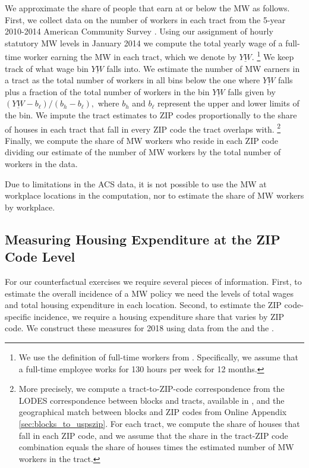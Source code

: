 We approximate the share of people that earn at or below the MW as follows.
First, we collect data on the number of workers in each tract from the 5-year 
2010-2014 American Community Survey \parencite{CensusACS}.
Using our assignment of hourly statutory MW levels in January 2014 we compute 
the total yearly wage of a full-time worker earning the MW in each tract, which 
we denote by $\underline{YW}$.%
\footnote{We use the definition of full-time workers from \textcite{IRSfulltime}.
Specifically, we assume that a full-time employee works for 130 hours per week
for 12 months.}
We keep track of what wage bin $\underline{YW}$ falls into.
We estimate the number of MW earners in a tract as the total number of workers 
in all bins below the one where $\underline{YW}$ falls plus a fraction of the 
total number of workers in the bin $\underline{YW}$ falls given by 
$\left(\underline{YW} - b_\ell\right)/\left(b_h - b_\ell\right),$
where $b_h$ and $b_\ell$ represent the upper and lower limits of 
the bin.
We impute the tract estimates to ZIP codes proportionally to the share of 
houses in each tract that fall in every ZIP code the tract overlaps with.%
\footnote{More precisely, we compute a tract-to-ZIP-code correspondence from
the LODES correspondence between blocks and tracts, available in 
\textcite{CensusLODES}, and the geographical match between blocks and ZIP codes
from Online Appendix \ref{sec:blocks_to_uspszip}.
For each tract, we compute the share of houses that fall in each ZIP code, and 
we assume that the share in the tract-ZIP code combination equals the share of
houses times the estimated number of MW workers in the tract.}
Finally, we compute the share of MW workers who reside in each ZIP 
code dividing our estimate of the number of MW workers by the total
number of workers in the data.

Due to limitations in the ACS data, it is not possible to use the MW at 
workplace locations in the computation, nor to estimate the share of MW workers 
by workplace.

\subsection{Measuring Housing Expenditure at the ZIP Code Level}
\label{sec:measure_housing_expenditure}

For our counterfactual exercises we require several pieces of information.
First, to estimate the overall incidence of a MW policy we need the levels 
of total wages and total housing expenditure in each location.
Second, to estimate the ZIP code-specific incidence, we require a housing 
expenditure share that varies by ZIP code.
We construct these measures for 2018 using data from the \textcite{IRS} and
the \textcite{hudSAFMR}.

